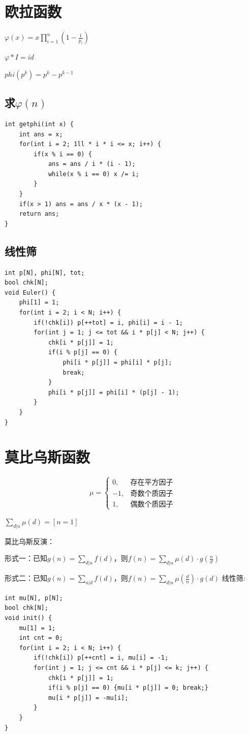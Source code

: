 \documentclass[a4paper,11pt,twoside,fontset = fandol,UTF8]{ctexbook} %
\begin{document}
	\section{欧拉函数}	
	$\varphi (x)=x\prod_{i=1}^{n}(1-\frac{1}{p_i})$
	
	$\varphi * I = id$
	
	$phi(p^k)=p^k-p^{k-1}$
	\subsection{求$\varphi (n)$}
	\begin{lstlisting}
int getphi(int x) {
    int ans = x;
    for(int i = 2; 1ll * i * i <= x; i++) {
        if(x % i == 0) {
            ans = ans / i * (i - 1);
            while(x % i == 0) x /= i;
        }
    }
    if(x > 1) ans = ans / x * (x - 1);
    return ans;
}
	\end{lstlisting}
	\subsection{线性筛}
	\begin{lstlisting}
int p[N], phi[N], tot;
bool chk[N];
void Euler() {
    phi[1] = 1;
    for(int i = 2; i < N; i++) {
        if(!chk[i]) p[++tot] = i, phi[i] = i - 1;
        for(int j = 1; j <= tot && i * p[j] < N; j++) {
            chk[i * p[j]] = 1;
            if(i % p[j] == 0) {
                phi[i * p[j]] = phi[i] * p[j];
                break;
            }
            phi[i * p[j]] = phi[i] * (p[j] - 1);
        }
    }
}
	\end{lstlisting}
	\section{莫比乌斯函数}
	$$
	\mu=\left\{
	\begin{aligned}
	0,&\text{存在平方因子}\\
	-1,&\text{奇数个质因子}\\
	1,&\text{偶数个质因子}
	\end{aligned}
	\right.
	$$
	
	$\sum_{d|n}\mu(d)=[n=1]$
	
	
	莫比乌斯反演：
	
	形式一：已知$g(n)=\sum_{d|n}f(d)$，则$f(n)=\sum_{d|n}\mu(d)\cdot g(\frac{n}{d})$
	
	形式二：已知$g(n)=\sum_{n|d}f(d)$，则$f(n)=\sum_{d|n}\mu(\frac{d}{n})\cdot g(d)$
	线性筛:
	\begin{lstlisting}
int mu[N], p[N];
bool chk[N];
void init() {
    mu[1] = 1;
    int cnt = 0;
    for(int i = 2; i < N; i++) {
        if(!chk[i]) p[++cnt] = i, mu[i] = -1;
        for(int j = 1; j <= cnt && i * p[j] <= k; j++) {
            chk[i * p[j]] = 1;
            if(i % p[j] == 0) {mu[i * p[j]] = 0; break;}
            mu[i * p[j]] = -mu[i];
        }
    }
} 
	\end{lstlisting}
\end{document}
